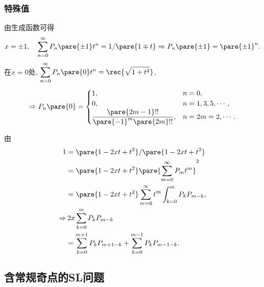 \documentclass[hidelinks]{ctexart}
\begin{document}

\subsubsection{特殊值} %
\label{ssub:特殊值}

由生成函数可得
\[ x = \pm 1,\quad \sum_{n=0}^\infty P_n\pare{\pm 1}t^n = 1/\pare{1\mp t} \Rightarrow P_n\pare{\pm 1} = \pare{\pm 1}^n. \]
在$x=0$处, $\displaystyle \sum_{n=0}^\infty P_n\pare{0} t^n = \rec{\sqrt{1+t^2}}$,
\[ \Rightarrow P_n\pare{0} = \begin{cases}
    1, & n=0, \\
    0, & n=1,3,5,\cdots,\\
    \displaystyle \frac{\pare{2m-1}!!}{\pare{-1}^m \pare{2m}!!}, & n=2m = 2,\cdots.
\end{cases} \]
\begin{sample}
    \begin{ex}
        由
        \begin{align*}
            1 &= \pare{1-2xt+t^2}/\pare{1-2xt+t^2} \\
            &= \pare{1-2xt + t^2}\pare{\sum_{m=0}^\infty P_m t^m}^2 \\
            &= \pare{1-2xt+t^2} \sum_{m=0}^\infty t^m \int_{k=0}^m P_kP_{m-k}, \\
            \Rightarrow &\, 2x \sum_{k=0}^m P_kP_{m-k}\\
            &= \sum_{k=0}^{m+1}P_kP_{m+1-k} + \sum_{k=0}^{m-1}P_kP_{m-1-k}.
        \end{align*}
    \end{ex}
\end{sample}



\subsection{含常规奇点的SL问题} %
\label{sub:含常规奇点的sl问题}
\end{document}

